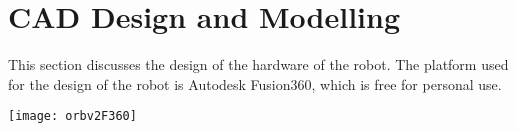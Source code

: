 \section{CAD Design and Modelling}

This section discusses the design of the hardware of the robot. The platform used for the design of the robot is Autodesk Fusion360, which is free for personal use. 
\begin{center}
    \texttt{[image: orbv2F360]}
\end{center}